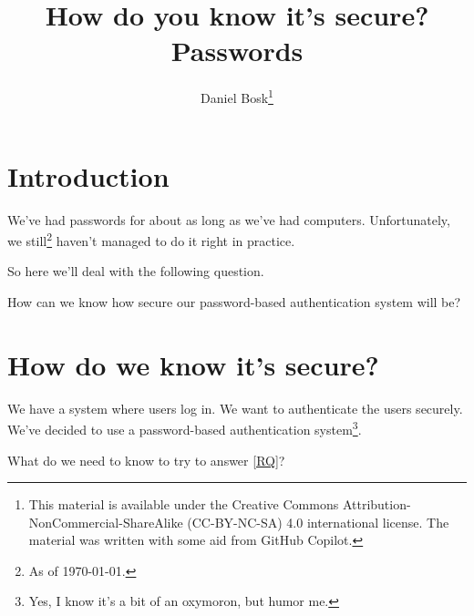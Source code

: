 \title{%
  How do you know it's secure?
  Passwords
}
\author{Daniel Bosk\thanks{%
    This material is available under the Creative Commons 
    Attribution-NonCommercial-ShareAlike (CC-BY-NC-SA) 4.0 international 
    license.
    The material was written with some aid from GitHub Copilot.
}}

\begin{frame}
  \maketitle
\end{frame}

\mode*

\begin{abstract}
  
\end{abstract}

\clearpage

\section{Introduction}

\begin{frame}
We've had passwords for about as long as we've had computers.
Unfortunately, we still\footnote{As of \today.} haven't managed to do it right 
in practice.
\end{frame}
So here we'll deal with the following question.

\begin{frame}
  \begin{question}\label{RQ}
    How can we know how secure our password-based authentication system will be?
  \end{question}
\end{frame}


\section{How do we know it's secure?}

\begin{frame}
We have a system where users log in.
We want to authenticate the users securely.
We've decided to use a password-based authentication system\footnote{%
  Yes, I know it's a bit of an oxymoron, but humor me.
}.
\end{frame}

\begin{frame}
  \begin{exercise}
    What do we need to know to try to answer \cref{RQ}?
  \end{exercise}
\end{frame}

